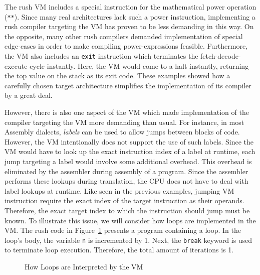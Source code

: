 The rush VM includes a special instruction for the mathematical power operation (\texttt{**}).
Since many real architectures lack such a power instruction,
implementing a rush compiler targeting the VM has proven to be less demanding in this way.
On the opposite, many other rush compilers demanded implementation of special edge-cases in order to make compiling power-expressions feasible.
Furthermore, the VM also includes an \texttt{exit} instruction which terminates the fetch-decode-execute cycle instantly.
Here, the VM would come to a halt instantly, returning the top value on the stack as its exit code.
These examples showed how a carefully chosen target architecture simplifies the implementation of its compiler by a great deal.

However, there is also one aspect of the VM which made implementation of the compiler targeting the VM more demanding than usual.
For instance, in most Assembly dialects, \emph{labels} can be used to allow jumps between blocks of code.
However, the VM intentionally does not support the use of such labels.
Since the VM would have to look up the exact instruction index of a label at runtime,
each jump targeting a label would involve some additional overhead.
This overhead is eliminated by the assembler during assembly of a program.
Since the assembler performs these lookups during translation,
the CPU does not have to deal with label lookups at runtime.
Like seen in the previous examples, jumping VM instruction require the exact index of the target instruction as their operands.
Therefore, the exact target index to which the instruction should jump must be known.
To illustrate this issue, we will consider how loops are implemented in the VM\@.
The rush code in Figure~\ref{fig:vm_loops} presents a program containing a loop.
In the loop's body, the variable \texttt{n} is incremented by 1.
Next, the \texttt{break} keyword is used to terminate loop execution.
Therefore, the total amount of iterations is 1.

\noindent
\begin{figure}[h]
	\begin{minipage}{.5\textwidth}
		\centering
	\end{minipage}%
	\begin{minipage}{.5\textwidth}
		\centering
	\end{minipage}
	\caption{How Loops are Interpreted by the VM}\label{fig:vm_loops}
\end{figure}

